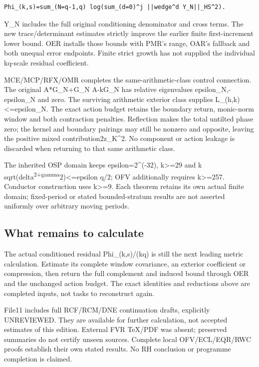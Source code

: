 \documentclass[
]{article}
\begin{document}
\begin{verbatim}
Phi_(k,s)=sum_(N=q-1,q) log(sum_(d=0)^j ||wedge^d Y_N||_HS^2).
\end{verbatim}

Y\_N includes the full original conditioning denominator and cross
terms. The new trace/determinant estimates strictly improve the earlier
finite first-increment lower bound. OER installs those bounds with PMR's
range, OAR's fallback and both unequal error endpoints. Finite strict
growth has not supplied the individual kq-scale residual coefficient.

MCE/MCP/RFX/OMR completes the same-arithmetic-class control connection.
The original A*G\_N+G\_N A-kG\_N has relative eigenvalues
epsilon\_N,-epsilon\_N and zero. The surviving arithmetic exterior class
supplies L\_(h,k)\textless=epsilon\_N. The exact action budget retains
the boundary return, monic-norm window and both contraction penalties.
Reflection makes the total untilted phase zero; the kernel and boundary
pairings may still be nonzero and opposite, leaving the positive mixed
contribution2\textbar z\_K\textbar\^{}2. No component or action leakage
is discarded when returning to that same arithmetic class.

The inherited OSP domain keeps epsilon=2\^{}(-32), k\textgreater=29 and
k sqrt(delta\textsuperscript{2+gamma}2)\textless=epsilon q/2; OFV
additionally requires k\textgreater=257. Conductor construction uses
k\textgreater=9. Each theorem retains its own actual finite domain;
fixed-period or stated bounded-stratum results are not asserted
uniformly over arbitrary moving periods.

\subsection{What remains to
calculate}\label{what-remains-to-calculate-2}

The actual conditioned residual Phi\_(k,s)/(kq) is still the next
leading metric calculation. Estimate its complete window covariance, an
exterior coefficient or compression, then return the full complement and
induced bound through OER and the unchanged action budget. The exact
identities and reductions above are completed inputs, not tasks to
reconstruct again.

File11 includes full RCF/RCM/DNE continuation drafts, explicitly
UNREVIEWED. They are available for further calculation, not accepted
estimates of this edition. External FVR TeX/PDF was absent; preserved
summaries do not certify unseen sources. Complete local OFV/ECL/EQR/RWC
proofs establish their own stated results. No RH conclusion or programme
completion is claimed.
\end{document}
